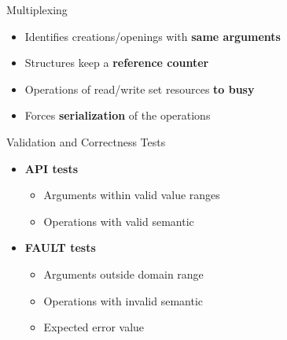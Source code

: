 		\begin{frame}[fragile]{Multiplexing}
			\begin{itemize}
				\item Identifies creations/openings with \textbf{same arguments}
				\item Structures keep a \textbf{reference counter}
				\item Operations of read/write set resources \textbf{to busy}
				\item Forces \textbf{serialization} of the operations
			\end{itemize}

		\end{frame}

		\begin{frame}[fragile]{Validation and Correctness Tests}
			\begin{itemize}
				\item \textbf{API tests}
				\begin{itemize}
					\item Arguments within valid value ranges
					\item Operations with valid semantic
				\end{itemize}
				\item \textbf{FAULT tests}
				\begin{itemize}
					\item Arguments outside domain range
					\item Operations with invalid semantic
					\item Expected error value
				\end{itemize}
			\end{itemize}

		\end{frame}

